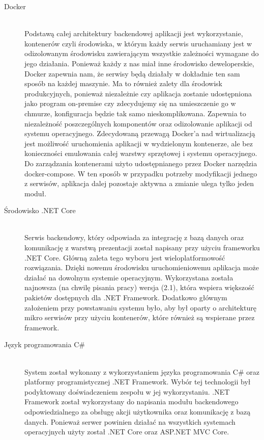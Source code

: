 \documentclass[a4paper,11pt,twoside]{report}
\theoremstyle{definition}
\begin{document}
\begin{description}
\item [Docker] \hfill \\
Podstawą całej architektury backendowej aplikacji jest wykorzystanie, kontenerów czyli środowiska, w którym każdy serwis uruchamiany jest w odizolowanym środowisku zawierającym wszystkie zależności wymagane do jego działania. Ponieważ każdy z nas miał inne środowisko deweloperskie, Docker zapewnia nam, że serwisy będą działały w dokładnie ten sam sposób na każdej maszynie. Ma to również zalety dla środowisk produkcyjnych, ponieważ niezależnie czy aplikacja zostanie udostępniona jako program on-premise czy zdecydujemy się na umieszczenie go w chmurze, konfiguracja będzie tak samo nieskomplikowana. Zapewnia to niezależność poszczególnych komponentów oraz odizolowanie aplikacji od systemu operacyjnego. Zdecydowaną przewagą Docker’a nad wirtualizacją jest możliwość uruchomienia aplikacji w wydzielonym kontenerze, ale bez konieczności emulowania całej warstwy sprzętowej i systemu operacyjnego. Do zarządzania kontenerami użyto udostępnianego przez Docker narzędzia docker-compose. W ten sposób w przypadku potrzeby modyfikacji jednego z serwisów, aplikacja dalej pozostaje aktywna a zmianie ulega tylko jeden moduł.
\item [Środowisko .NET Core] \hfill \\
Serwis backendowy, który odpowiada za integrację z bazą danych oraz komunikację z warstwą prezentacji został napisany przy użyciu frameworku .NET Core. Główną zaleta tego wyboru jest wieloplatformowość rozwiązania. Dzięki nowemu środowisku uruchomieniowemu aplikacja może działać na dowolnym systemie operacyjnym. Wykorzystana została najnowsza (na chwilę pisania pracy) wersja (2.1), która wspiera większość pakietów dostępnych dla .NET Framework. Dodatkowo głównym założeniem przy powstawaniu systemu było, aby był oparty o architekturę mikro serwisów przy użyciu kontenerów, które również są wspierane przez framework.
\item [Język programowania C\# ] \hfill \\
System został wykonany z wykorzystaniem języka programowania C\# oraz platformy programistycznej .NET Framework. Wybór tej technologii był podyktowany doświadczeniem zespołu w jej wykorzystaniu. .NET Framework został wykorzystany do napisania modułu backendowego odpowiedzialnego za obsługę akcji użytkownika oraz komunikację z bazą danych. Ponieważ serwer powinien działać na wszystkich systemach operacyjnych użyty został .NET Core oraz ASP.NET MVC Core.

\end{description}
\end{document}
